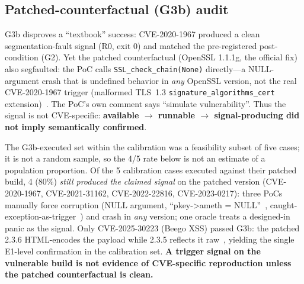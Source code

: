 \documentclass[11pt]{article}
\begin{document}
\subsection{Patched-counterfactual (G3b) audit}
\label{sec:g3b}
G3b disproves a ``textbook'' success: CVE-2020-1967 produced a clean segmentation-fault signal (R0, exit 0) and matched the pre-registered post-condition (G2). Yet the patched counterfactual (OpenSSL 1.1.1g, the official fix) also segfaulted: the PoC calls \texttt{SSL\_check\_chain(None)} directly---a NULL-argument crash that is undefined behavior in \emph{any} OpenSSL version, not the real CVE-2020-1967 trigger (malformed TLS~1.3 \texttt{signature\_algorithms\_cert} extension)~\citep{nvd20201967}. The PoC's own comment says ``simulate vulnerability''. Thus the signal is not CVE-specific: \textbf{available $\to$ runnable $\to$ signal-producing did not imply semantically confirmed}.

The G3b-executed set within the calibration was a feasibility subset of five cases; it is not a random sample, so the 4/5 rate below is not an estimate of a population proportion. Of the 5 calibration cases executed against their patched build, 4 (80\%) \emph{still produced the claimed signal} on the patched version (CVE-2020-1967, CVE-2021-31162, CVE-2022-22816, CVE-2023-0217): three PoCs manually force corruption (NULL argument, ``pkey->ameth = NULL''~\citep{nvd20230217}, caught-exception-as-trigger~\citep{nvd202222816}) and crash in \emph{any} version; one oracle treats a designed-in panic as the signal. Only CVE-2025-30223 (Beego XSS) passed G3b: the patched 2.3.6 HTML-encodes the payload while 2.3.5 reflects it raw~\citep{nvd202530223}, yielding the single E1-level confirmation in the calibration set. \textbf{A trigger signal on the vulnerable build is not evidence of CVE-specific reproduction unless the patched counterfactual is clean.}
\end{document}
